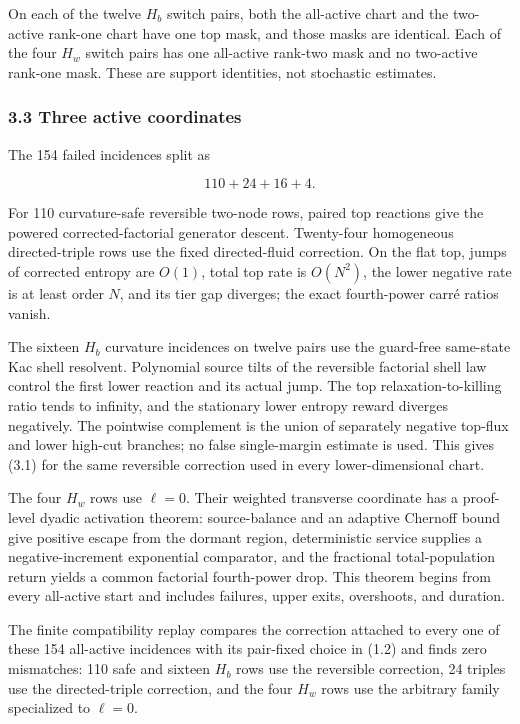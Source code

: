On each of the twelve \(H_b\) switch pairs, both the all-active chart
and the two-active rank-one chart have one top mask, and those masks are
identical. Each of the four \(H_w\) switch pairs has one all-active
rank-two mask and no two-active rank-one mask. These are support
identities, not stochastic estimates.

\subsubsection{3.3 Three active
coordinates}

The 154 failed incidences split as

\[
 110+24+16+4.                                        \tag{3.4}
\]

For 110 curvature-safe reversible two-node rows, paired top reactions
give the powered corrected-factorial generator descent. Twenty-four
homogeneous directed-triple rows use the fixed directed-fluid
correction. On the flat top, jumps of corrected entropy are \(O(1)\),
total top rate is \(O(N^2)\), the lower negative rate is at least order
\(N\), and its tier gap diverges; the exact fourth-power carré ratios
vanish.

The sixteen \(H_b\) curvature incidences on twelve pairs use the
guard-free same-state Kac shell resolvent. Polynomial source tilts of
the reversible factorial shell law control the first lower reaction and
its actual jump. The top relaxation-to-killing ratio tends to infinity,
and the stationary lower entropy reward diverges negatively. The
pointwise complement is the union of separately negative top-flux and
lower high-cut branches; no false single-margin estimate is used. This
gives (3.1) for the same reversible correction used in every
lower-dimensional chart.

The four \(H_w\) rows use \(\ell=0\). Their weighted transverse
coordinate has a proof-level dyadic activation theorem: source-balance
and an adaptive Chernoff bound give positive escape from the dormant
region, deterministic service supplies a negative-increment exponential
comparator, and the fractional total-population return yields a common
factorial fourth-power drop. This theorem begins from every all-active
start and includes failures, upper exits, overshoots, and duration.

The finite compatibility replay compares the correction attached to
every one of these 154 all-active incidences with its pair-fixed choice
in (1.2) and finds zero mismatches: 110 safe and sixteen \(H_b\) rows
use the reversible correction, 24 triples use the directed-triple
correction, and the four \(H_w\) rows use the arbitrary family
specialized to \(\ell=0\).

